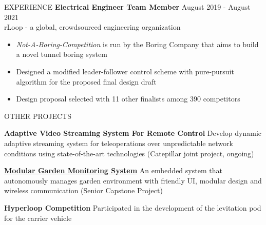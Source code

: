 \documentclass{lib/resume} %
\begin{document}
\begin{rSection}{EXPERIENCE}
    \textbf{Electrical Engineer Team Member} \hfill August 2019 - August 2021
    \\	rLoop - a global, crowdsourced engineering organization \hfill \textit{}
    \begin{itemize}
        \itemsep -4pt {}
        \item \textit{Not-A-Boring-Competition} is run by the Boring Company that aims to build a novel tunnel boring system
        \item Designed a modified leader-follower control scheme with pure-pursuit algorithm for the proposed final design draft
        \item Design proposal selected with 11 other finalists among 390 competitors
    \end{itemize}



\end{rSection}


\begin{rSection}{OTHER PROJECTS}
    \vspace{-1em}
    \item {\textbf{Adaptive Video Streaming System For Remote Control}} {Develop dynamic adaptive streaming system for teleoperations over unpredictable network conditions using state-of-the-art technologies (Catepillar joint project, ongoing)}
    \item \href{https://github.com/liu2g/mgms}{\textbf{Modular Garden Monitoring
    System}} {An embedded system that autonomously manages garden environment
    with friendly UI, modular design and wireless communication (Senior Capstone
    Project)}
    \item \textbf{Hyperloop Competition} {Participated in the development of
    the levitation pod for the carrier vehicle}

\end{rSection}

%
%
%
%
%
\end{document}
